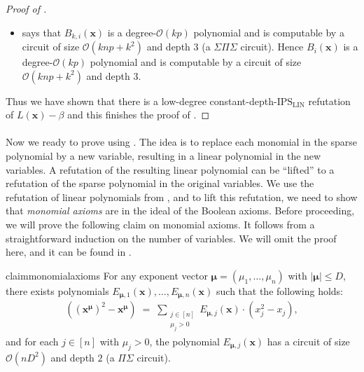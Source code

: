 \documentclass[11pt]{article}
\newcommand{\bigO}{\mathcal{O}}
\newcommand{\IPSLIN}{\mathrm{IPS}_{\mathrm{LIN}}}
\begin{document}
\begin{proof}[Proof of ]
\begin{itemize}
    \item {} says that $B_{k,i}(\mathbf{x})$ is a degree-$\bigO(k p)$ polynomial and is computable by a circuit of size $\bigO(k np + k^{2})$ and depth $3$ (a $\Sigma \Pi \Sigma$ circuit). Hence $B_{i}(\mathbf{x})$ is a degree-$\bigO(k p)$ polynomial and is computable by a circuit of size $\bigO(k np + k^{2})$ and depth $3$.
\end{itemize}
Thus we have shown that there is a low-degree constant-depth-$\IPSLIN$ refutation of $L(\mathbf{x}) - \beta$ and this finishes the proof of .
\end{proof}

\paragraph{}Now we ready to prove  using . The idea is to replace each monomial in the sparse polynomial by a new variable, resulting in a linear polynomial in the new variables. A refutation of the resulting linear polynomial can be ``lifted'' to a refutation of the sparse polynomial in the original variables. We use the refutation of linear polynomials from , and to lift this refutation, we need to show that \emph{monomial axioms} are in the ideal of the Boolean axioms. Before proceeding, we will prove the following claim on monomial axioms. It follows from a straightforward induction on the number of variables. We will omit the proof here, and it can be found in .\\


\begin{restatable}{claim}{monomialaxioms}\label{claim:monomial-axioms}
For any exponent vector $\bm{\mu} = (\mu_{1},\ldots,\mu_{n})$ with $|\bm{\mu}| \leq D$, there exists polynomials $E_{\bm{\mu},1}(\mathbf{x}), \ldots, E_{\bm{\mu},n}(\mathbf{x})$ such that the following holds:
\begin{align*}
    ((\mathbf{x}^{\bm{\mu}})^{2} - \mathbf{x}^{\bm{\mu}}) \; = \; \sum_{\substack{j \in [n] \\ \mu_{j} > 0}} E_{\bm{\mu},j}(\mathbf{x}) \cdot (x_{j}^{2} - x_{j}),
\end{align*}
and for each $j \in [n]$ with $\mu_{j} > 0$, the polynomial $E_{\bm{\mu},j}(\mathbf{x})$ has a circuit of size $\bigO(nD^{2})$ and depth $2$ (a $\Pi \Sigma$ circuit).
\end{restatable}
\end{document}
